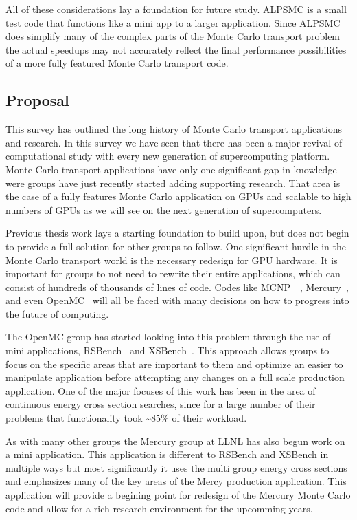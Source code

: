 All of these considerations lay a foundation for future study.
%
ALPSMC is a small test code that functions like a mini app to a larger application.
%
Since ALPSMC does simplify many of the complex parts of the Monte Carlo transport problem the actual speedups may not accurately reflect the final performance possibilities of a more fully featured Monte Carlo transport code.
%

\subsection{\textbf{Proposal}}

This survey has outlined the long history of Monte Carlo transport applications and research.
%
In this survey we have seen that there has been a major revival of computational study with every new generation of supercomputing platform.
%
Monte Carlo transport applications have only one significant gap in knowledge were groups have just recently started adding supporting research.
%
That area is the case of a fully features Monte Carlo application on GPUs and scalable to high numbers of GPUs as we will see on the next generation of supercomputers.

Previous thesis work lays a starting foundation to build upon, but does not begin to provide a full solution for other groups to follow.
%
One significant hurdle in the Monte Carlo transport world is the necessary redesign for GPU hardware.
%
It is important for groups to not need to rewrite their entire applications, which can consist of hundreds of thousands of lines of code.
%
Codes like MCNP~\cite{goorley2012initial}~\cite{padovani2012mcnpx}, Mercury~\cite{brantley2013recent}, and even OpenMC~\cite{romano2015openmc}
will all be faced with many decisions on how to progress into the future of computing.

The OpenMC group has started looking into this problem through the use of mini applications, RSBench~\cite{tramm2014performance} and XSBench~\cite{tramm2014xsbench}. 
%
This approach allows groups to focus on the specific areas that are important to them and optimize an easier to manipulate application before attempting any changes on a full scale production application.
%
One of the major focuses of this work has been in the area of continuous energy cross section searches, since for a large number of their problems that functionality took \textasciitilde85\% of their workload.

As with many other groups the Mercury group at LLNL has also begun work on a mini application.
%
This application is different to RSBench and XSBench in multiple ways but most significantly it uses the multi group energy cross sections and emphasizes  many of the key areas of the Mercy production application.
%
This application will provide a begining point for redesign of the Mercury Monte Carlo code and allow for a rich research environment for the upcomming years.
%


